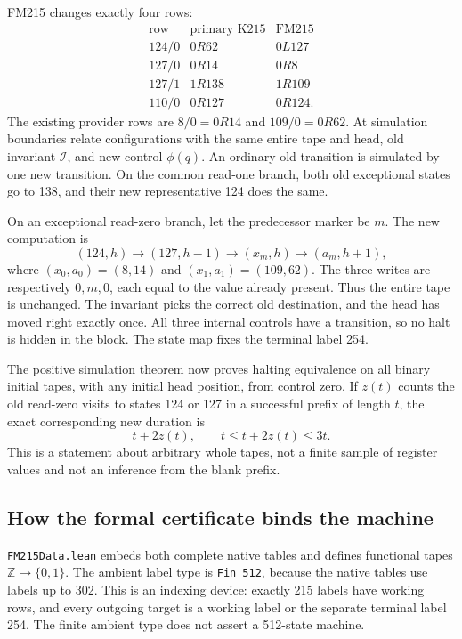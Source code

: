 FM215 changes exactly four rows:
\[
\begin{array}{c|cc}
\text{row}&\text{primary K215}&\text{FM215}\\\hline
124/0&0R62&0L127\\
127/0&0R14&0R8\\
127/1&1R138&1R109\\
110/0&0R127&0R124.
\end{array}
\]
The existing provider rows are $8/0=0R14$ and $109/0=0R62$.
At simulation boundaries relate configurations with the same entire tape
and head, old invariant $\mathcal I$, and new control $\phi(q)$.
An ordinary old transition is simulated by one new transition. On the
common read-one branch, both old exceptional states go to 138, and their
new representative 124 does the same.

On an exceptional read-zero branch, let the predecessor marker be $m$.
The new computation is
\[
 (124,h)\longrightarrow(127,h-1)
 \longrightarrow(x_m,h)\longrightarrow(a_m,h+1),
\]
where $(x_0,a_0)=(8,14)$ and $(x_1,a_1)=(109,62)$.
The three writes are respectively $0,m,0$, each equal to the value
already present. Thus the entire tape is unchanged. The invariant picks
the correct old destination, and the head has moved right exactly once.
All three internal controls have a transition, so no halt is hidden in
the block. The state map fixes the terminal label 254.

The positive simulation theorem now proves halting equivalence on all
binary initial tapes, with any initial head position, from control zero.
If $z(t)$ counts the old read-zero visits to states 124 or 127 in a
successful prefix of length $t$, the exact corresponding new duration is
\[
 t+2z(t),\qquad t\leq t+2z(t)\leq3t.
\]
This is a statement about arbitrary whole tapes, not a finite sample of
register values and not an inference from the blank prefix.

\subsection{How the formal certificate binds the machine}

\texttt{FM215Data.lean} embeds both complete native tables and defines
functional tapes $\mathbb Z\to\{0,1\}$. The ambient label type is
\texttt{Fin 512}, because the native tables use labels up to 302. This
is an indexing device: exactly 215 labels have working rows, and every
outgoing target is a working label or the separate terminal label 254.
The finite ambient type does not assert a 512-state machine.

